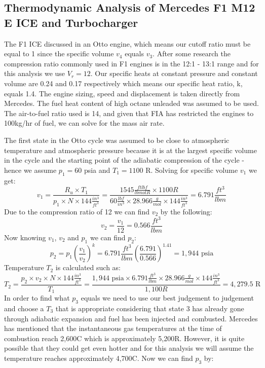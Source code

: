 \documentclass{article}
\begin{document}
\subsection{Thermodynamic Analysis of Mercedes F1 M12 E ICE and Turbocharger}
The F1 ICE discussed in an Otto engine, which means our cutoff ratio must be equal to 1 since the specific volume $v_4$ equals $v_3$. After some research the compression ratio commonly used in F1 engines is in the 12:1 - 13:1 range and for this analysis we use $V_r = 12$. Our specific heats at constant pressure and constant volume are 0.24 and 0.17 respectively which means our specific heat ratio, k, equals 1.4. The engine sizing, speed and displacement is taken directly from Mercedes\cite{Eperformance}. The fuel heat content of high octane unleaded was assumed to be used. The air-to-fuel ratio used is 14, and given that FIA has restricted the engines to 100kg/hr of fuel, we can solve for the mass air rate. \par
The first state in the Otto cycle was assumed to be close to atmospheric temperature and atmospheric pressure because it is at the largest specific volume in the cycle and the starting point of the adiabatic compression of the cycle - hence we assume $p_1 = 60$ psia and $T_1 = 1100$ R. Solving for specific volume $v_1$ we get:
\begin{equation}
    v_1 = \frac{R_u\times T_1}{p_1\times N\times144\frac{in^3}{ft^3}}
     = \frac{1545\frac{ftlbf}{lbmolR}\times 1100 R}{60\frac{lbf}{in^3}\times 28.966\frac{g}{mol}\times144\frac{in^3}{ft^3}} = 6.791 \frac{ft^3}{lbm}
\end{equation}
\noindent Due to the compression ratio of 12 we can find $v_2$ by the following:
\begin{equation}
    v_2 = \frac{v_1}{12} = 0.566 \frac{ft^3}{lbm}
\end{equation}
\noindent Now knowing $v_1$, $v_2$ and $p_1$ we can find $p_2$:
\begin{equation}
    p_2 = p_1(\frac{v_1}{v_2})^k = 6.791 \frac{ft^3}{lbm}(\frac{6.791}{0.566})^{1.41} = 1,944 \mbox{ psia}
\end{equation}
\noindent Temperature $T_2$ is calculated such as:
\begin{equation}
    T_2 = \frac{p_2\times v_2\times N\times 144\frac{in^3}{ft^3}}{T_1} = \frac{1,944 \mbox{ psia}\times 6.791\frac{ft^3}{lbm}\times 28.966\frac{g}{mol}\times 144\frac{in^3}{ft^3}}{1,100 R} = 4,279.5\mbox{ R}
\end{equation}
\noindent In order to find what $p_3$ equals we need to use our best judgement to judgement and choose a $T_3$ that is appropriate considering that state 3 has already gone through adiabatic expansion and fuel has been injected and combusted. Mercedes has mentioned that the instantaneous gas temperatures at the time of combustion reach 2,600C which is approximately 5,200R\cite{F1engineFacts}. However, it is quite possible that they could get even hotter and for this analysis we will assume the temperature reaches approximately 4,700C. Now we can find $p_3$ by:
\end{document}

